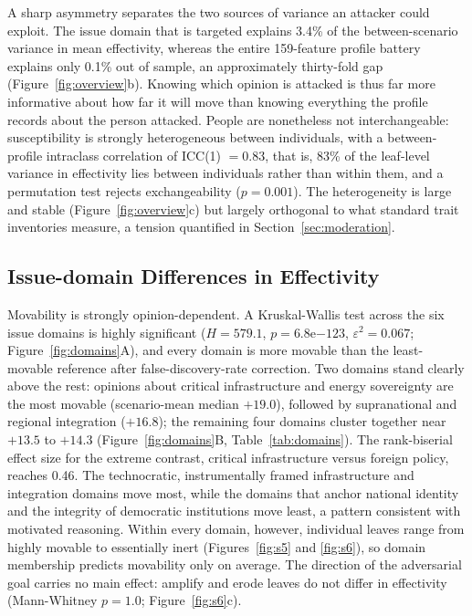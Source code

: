 \documentclass[11pt,a4paper]{article}
\begin{document}
A sharp asymmetry separates the two sources of variance an attacker could exploit. The issue
domain that is targeted explains 3.4\% of the between-scenario variance in mean effectivity,
whereas the entire 159-feature profile battery explains only 0.1\% out of sample, an approximately
thirty-fold gap (Figure~\ref{fig:overview}b). Knowing which opinion is attacked is thus far more
informative about how far it will move than knowing everything the profile records about the
person attacked. People are nonetheless not interchangeable: susceptibility is strongly
heterogeneous between individuals, with a between-profile intraclass correlation of
ICC(1) $= 0.83$, that is, 83\% of the leaf-level variance in effectivity lies between individuals
rather than within them, and a permutation test rejects exchangeability ($p = 0.001$). The
heterogeneity is large and stable (Figure~\ref{fig:overview}c) but largely orthogonal to what
standard trait inventories measure, a tension quantified in Section~\ref{sec:moderation}.

\subsection{Issue-domain Differences in Effectivity}

Movability is strongly opinion-dependent. A Kruskal-Wallis test across the six issue domains is
highly significant ($H = 579.1$, $p = 6.8\mathrm{e}{-123}$, $\varepsilon^2 = 0.067$;
Figure~\ref{fig:domains}A), and every domain is more movable than the least-movable reference
after false-discovery-rate correction. Two domains stand clearly above the rest: opinions about
critical infrastructure and energy sovereignty are the most movable (scenario-mean median $+19.0$),
followed by supranational and regional integration ($+16.8$); the remaining four domains cluster
together near $+13.5$ to $+14.3$ (Figure~\ref{fig:domains}B, Table~\ref{tab:domains}). The
rank-biserial effect size for the extreme contrast, critical infrastructure versus foreign policy,
reaches 0.46. The technocratic, instrumentally framed infrastructure and integration domains move
most, while the domains that anchor national identity and the integrity of democratic institutions
move least, a pattern consistent with motivated reasoning. Within every domain, however, individual
leaves range from highly movable to essentially inert (Figures~\ref{fig:s5} and \ref{fig:s6}), so
domain membership predicts movability only on average. The direction of the adversarial goal
carries no main effect: amplify and erode leaves do not differ in effectivity (Mann-Whitney
$p = 1.0$; Figure~\ref{fig:s6}c).
\end{document}
